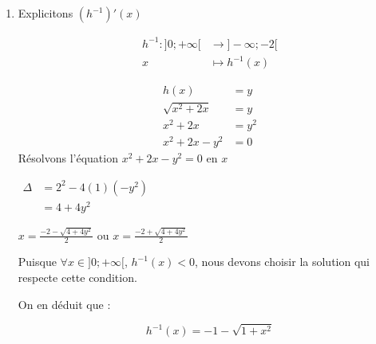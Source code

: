 \documentclass[12pt,a4paper]{article}
\begin{document}
\begin{enumerate}
\begin{enumerate}
\( \text{Donc } \boxed{ h(-3)=\sqrt{3} } \)

    \underline{\textbf{Pour} \( (h^{-1})'( \sqrt{3} )  \) }:
\[\text{On a : }  (h^{-1})'(y) = \frac{1}{h'(h^{-1}(y))} \text{donc } (h^{-1})'(\sqrt{3}) = \frac{1}{h'(h^{-1}(\sqrt{3}))}\]

Calcul de \( h^{-1}(\sqrt{3}) \):

On sait que \( h(-3) = \sqrt{3} \), donc \( h^{-1}(\sqrt{3}) = -3\)

Donc \( (h^{-1})'(\sqrt{3}) = \frac{1}{h'(h^{-1}(\sqrt{3}))}\) devient \( (h^{-1})'(\sqrt{3}) = \frac{1}{h'(-3)}\)

Calcul de \( h'(-3) \):

\(
\begin{aligned}
   h'(-3) &= \frac{-3+1}{\sqrt{(-3)^2 + 2(-3)}}\\
          &= \frac{-2}{\sqrt{9 - 6}}\\
          &= \frac{-2}{\sqrt{3}}\\
          &= -\frac{2\sqrt{3}}{3}
\end{aligned}
\)

Calcul de \( (h^{-1})'(\sqrt{3}) \)

\(
\begin{aligned}
(h^{-1})'(\sqrt{3}) &= \frac{1}{h'(-3)}
                    &= \frac{1}{-\frac{2\sqrt{3}}{3}}
                    &= -\frac{3}{2\sqrt{3}}
                    &= -\frac{\sqrt{3}}{2}
\end{aligned}
\)

\[
\boxed{(h^{-1})'(\sqrt{3}) = -\frac{\sqrt{3}}{2}}
\]
\item Explicitons \( (h^{-1})'(x) \)

\begin{align*}
h^{-1}:]0; +\infty [&\rightarrow ]-\infty ; -2[\\
x&\mapsto h^{-1}(x)
\end{align*}


\begin{align*}
    h(x) &= y\\
\sqrt{x^2 + 2x} &= y\\
    x^2 + 2x &= y^2\\
    x^2 + 2x - y^2 &= 0
\end{align*}
Résolvons l'équation \( x^2 + 2x - y^2 = 0 \) en \(x\)

\(
\begin{aligned}
    \Delta &= 2^{2}-4(1)(-y^2)\\
           &=4+4y^2
\end{aligned}
\)

\( x = \frac{-2 - \sqrt{4 + 4y^2}}{2} \) ou \( x = \frac{-2 + \sqrt{4 + 4y^2}}{2} \)

Puisque \( \forall x \in ]0; +\infty [ \), \( h^{-1}(x) < 0 \), nous devons choisir la solution qui respecte cette condition.

On en déduit que :

\[
\boxed{h^{-1}(x) = -1 - \sqrt{1 + x^2}}
\]
    \end{enumerate}
\end{enumerate}
\end{document}
